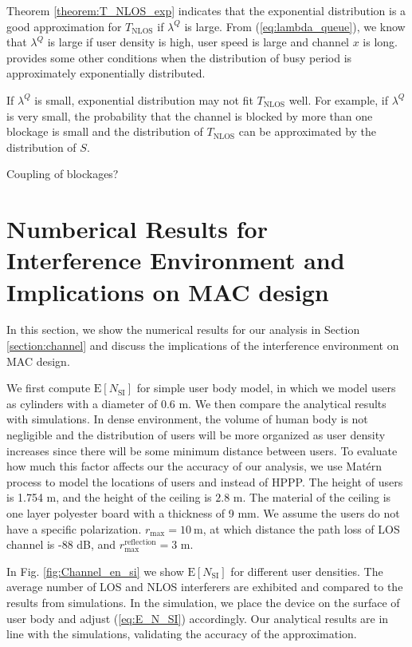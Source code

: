 \documentclass[10pt, conference, letterpaper]{IEEEtran}
\newcommand*{\Rom}[1]{\uppercase\expandafter{\romannumeral #1\relax}} %
\DeclareMathOperator*{\NLOS}{\mathrm{NLOS}}
\begin{document}
Theorem \ref{theorem:T_NLOS_exp} indicates that the exponential distribution is a good approximation for $T_{\NLOS}$ if $\lambda^Q$ is large. From (\ref{eq:lambda_queue}), we know that $\lambda^Q$ is large if user density is high, user speed is large and channel $x$ is long. \cite{busyperiod_exponential} provides some other conditions when the distribution of busy period is approximately exponentially distributed.
 
If $\lambda^Q$ is small, exponential distribution may not fit $T_{\NLOS}$ well. For example, if $\lambda^Q$ is very small, the probability that the channel is blocked by more than one blockage is small and the distribution of $T_{\NLOS}$ can be approximated by the distribution of $S$.

Coupling of blockages?


\section{Numberical Results for Interference Environment and Implications on MAC design} \label{section:channel_numerical}
In this section, we show the numerical results for our analysis in Section \ref{section:channel} and discuss the implications of the interference environment on MAC design. 

We first compute $\mathrm{E}[N_{\mathrm{SI}}]$ for simple user body model, in which we model users as cylinders with a diameter of 0.6 m. We then compare the analytical results with simulations. In dense environment, the volume of human body is not negligible and the distribution of users will be more organized as user density increases since there will be some minimum distance between users. To evaluate how much this factor affects our the accuracy of our analysis, we use Mat\'ern \Rom{3} process \cite{matern} to model the locations of users and instead of HPPP. The height of users is 1.754 m, and the height of the ceiling is $2.8$ m. The material of the ceiling is one layer polyester board with a thickness of 9 mm. We assume the users do not have a specific polarization. $r_{\max} = 10\mathrm{~m}$, at which distance the path loss of LOS channel is -88 dB, and $r_{\max}^{\mathrm{reflection}} = 3$ m. 

In Fig. \ref{fig:Channel_en_si} we show $\mathrm{E}[N_{\mathrm{SI}}]$ for different user densities. The average number of LOS and NLOS interferers are exhibited and compared to the results from simulations. In the simulation, we place the device on the surface of user body and adjust (\ref{eq:E_N_SI}) accordingly. Our analytical results are in line with the simulations, validating the accuracy of the approximation. 
\end{document}
